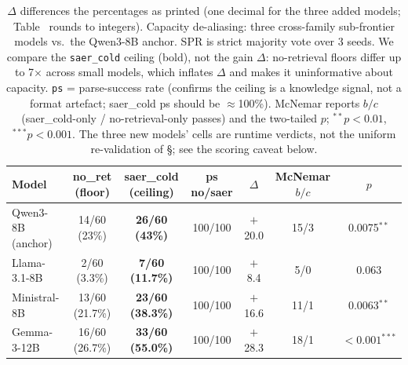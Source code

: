 \documentclass[letterpaper]{article} %
\newcommand{\bodyref}[1]{\getrefnumber{#1}}
\begin{document}
\begin{table}[tbp]
\centering
\caption{$\Delta$ differences the percentages as printed (one decimal for the
three added models; Table~\bodyref{tab:main} rounds to integers).  Capacity de-aliasing: three cross-family sub-frontier models
vs.\ the Qwen3-8B anchor.  SPR is strict majority vote over 3 seeds.
We compare the \texttt{saer\_cold} ceiling (bold), not the gain $\Delta$:
no-retrieval floors differ up to 7$\times$ across small models, which
inflates $\Delta$ and makes it uninformative about capacity.
\texttt{ps} = parse-success rate (confirms the ceiling is a knowledge
signal, not a format artefact; saer\_cold ps should be $\approx$100\%).
McNemar reports $b/c$ (saer\_cold-only / no-retrieval-only passes) and
the two-tailed $p$; ${}^{**}p{<}0.01$, ${}^{***}p{<}0.001$.  The three
new models' cells are runtime verdicts, not the uniform re-validation
of \S\bodyref{sec:protocol}; see the scoring caveat below.}
\label{tab:capacity_dealias}
\footnotesize\setlength{\tabcolsep}{3pt}
\begin{tabular}{lcccccc}
\toprule
Model & no\_ret (floor) & \textbf{saer\_cold (ceiling)} & ps no/saer & $\Delta$ & McNemar $b/c$ & $p$ \\
\midrule
Qwen3-8B (anchor) & 14/60 (23\%) & \textbf{26/60 (43\%)} & 100/100 & $+$20.0 & 15/3 & 0.0075$^{**}$ \\
Llama-3.1-8B      & 2/60 (3.3\%)   & \textbf{7/60 (11.7\%)}  & 100/100 & $+$8.4  & 5/0  & 0.063 \\
Ministral-8B      & 13/60 (21.7\%) & \textbf{23/60 (38.3\%)} & 100/100 & $+$16.6 & 11/1 & 0.0063$^{**}$ \\
Gemma-3-12B       & 16/60 (26.7\%) & \textbf{33/60 (55.0\%)} & 100/100 & $+$28.3 & 18/1 & ${<}0.001^{***}$ \\
\bottomrule
\end{tabular}
\end{table}
\end{document}
